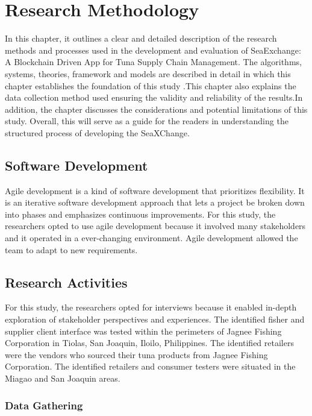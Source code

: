 \chapter{Research Methodology}
In this chapter, it outlines a clear and detailed description of the research methods and processes used in the development and evaluation of SeaExchange: A Blockchain Driven App for Tuna Supply Chain Management. The algorithms, systems, theories, framework and models are described in detail in which this chapter establishes the foundation of this study .This chapter also explains the data collection method used ensuring the validity and reliability of the results.In addition, the chapter discusses the considerations and potential limitations of this study. Overall, this will serve as a guide for the readers in understanding the structured process of developing the SeaXChange.

\section{Software Development}
Agile development is a kind of software development that prioritizes flexibility. It is an iterative software development approach that lets a project be broken down into phases and emphasizes continuous improvements. For this study, the researchers opted to use agile development because it involved many stakeholders and it operated in a ever-changing environment. Agile development allowed the team to adapt to new requirements.
\section{Research Activities}
For this study, the researchers opted for interviews because it enabled in-depth exploration of stakeholder perspectives and experiences. 
The identified fisher and supplier client interface was tested within the perimeters of Jagnee Fishing Corporation in Tiolas, San Joaquin, Iloilo, Philippines. The identified retailers were the vendors who sourced their tuna products from Jagnee Fishing Corporation. The identified retailers and consumer testers were situated in the Miagao and San Joaquin areas. 

\subsection{Data Gathering}

